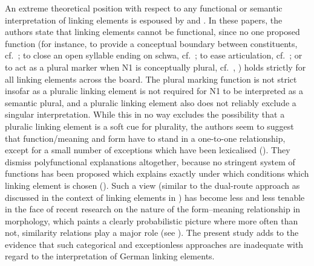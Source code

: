 An extreme theoretical position with respect to any functional or semantic interpretation of linking elements is espoused by \textcite{NeefBorgwaldt2012} and \textcite{Neef2015}.
In these papers, the authors state that linking elements cannot be functional, since no one proposed function (for instance, to provide a conceptual boundary between constituents, cf.\ \citealt[530]{Fuhrhop1996}; to close an open syllable ending on schwa, cf.\ \citealt[446]{Wegener2003}; to ease articulation, cf.\ \citealt[177]{Wegener2005}; or to act as a plural marker when N1 is conceptually plural, cf.\ \citealt[534]{Fuhrhop1996}, \citealt[427]{Wegener2003}) holds strictly for all linking elements across the board.
The plural marking function is not strict insofar as a pluralic linking element is not required for N1 to be interpreted as a semantic plural, and a pluralic linking element also does not reliably exclude a singular interpretation.
While this in no way excludes the possibility that a pluralic linking element is a soft cue for plurality, the authors seem to suggest that function\slash meaning and form have to stand in a one-to-one relationship, except for a small number of exceptions which have been lexicalised (\egg \citealt[42]{NeefBorgwaldt2012}).
They dismiss polyfunctional explanations altogether, because no stringent system of functions has been proposed which explains exactly under which conditions which linking element is chosen (\egg \citealt[27--29]{NeefBorgwaldt2012}).
Such a view (similar to the dual-route approach as discussed in the context of linking elements in \citealt{KrottEa2007}) has become less and less tenable in the face of recent research on the nature of the form--meaning relationship in morphology, which paints a clearly probabilistic picture where more often than not, similarity relations play a major role (see \citealt[107]{ArndtlappeEa2016}).
The present study adds to the evidence that such categorical and exceptionless approaches are inadequate with regard to the interpretation of German linking elements.


